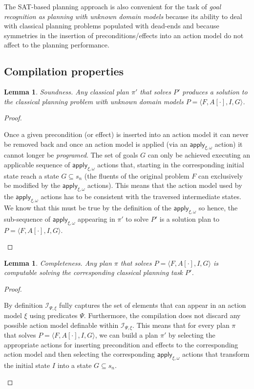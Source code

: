 \documentclass{article}
\newcommand{\tup}[1]{{\langle #1 \rangle}}
\newtheorem{mylemma}[mytheorem]{Lemma}
\begin{document}
The SAT-based planning approach is also convenient for the task of {\em goal recognition as planning with unknown domain models} because its ability to deal with classical planning problems populated with dead-ends and because symmetries in the insertion of preconditions/effects into an action model do not affect to the planning performance. 

\subsection{Compilation properties}
\begin{mylemma}
Soundness. Any classical plan $\pi'$ that solves $P'$ produces a solution to the classical planning problem with unknown domain models $P=\tup{F,A[\cdot],I,G}$.
\end{mylemma}

\begin{proof}[Proof]
\begin{small}
Once a given precondition (or effect) is inserted into an action model it can never be removed back and once an action model is applied (via an $\mathsf{apply_{\xi,\omega}}$ action) it cannot longer be {\em programed}. The set of goals $G$ can only be achieved executing an applicable sequence of $\mathsf{apply_{\xi,\omega}}$ actions that, starting in the corresponding initial state reach a state $G \subseteq s_n$ (the fluents of the original problem $F$ can exclusively be modified by the $\mathsf{apply_{\xi,\omega}}$ actions). This means that the action model used by the $\mathsf{apply_{\xi,\omega}}$ actions has to be consistent with the traversed intermediate states. We know that this must be true by the definition of the $\mathsf{apply_{\xi,\omega}}$ so hence, the sub-sequence of $\mathsf{apply_{\xi,\omega}}$ appearing in $\pi'$ to solve $P'$ is a solution plan to $P=\tup{F,A[\cdot],I,G}$. 
\end{small}
\end{proof}

\begin{mylemma}
Completeness. Any plan $\pi$ that solves $P=\tup{F,A[\cdot],I,G}$ is computable solving the corresponding classical planning task $P'$.
\end{mylemma}

\begin{proof}[Proof]
\begin{small}
By definition ${\mathcal I}_{\Psi,\xi}$ fully captures the set of elements that can appear in an action model $\xi$ using predicates $\Psi$. Furthermore, the compilation does not discard any possible action model definable within ${\mathcal I}_{\Psi,\xi}$. This means that for every plan $\pi$ that solves $P=\tup{F,A[\cdot],I,G}$, we can build a plan $\pi'$ by selecting the appropriate actions for inserting precondition and effects to the corresponding action model and then selecting the corresponding $\mathsf{apply_{\xi,\omega}}$ actions that transform the initial state $I$ into a state $G \subseteq s_n$.
\end{small}
\end{proof}
\end{document}
